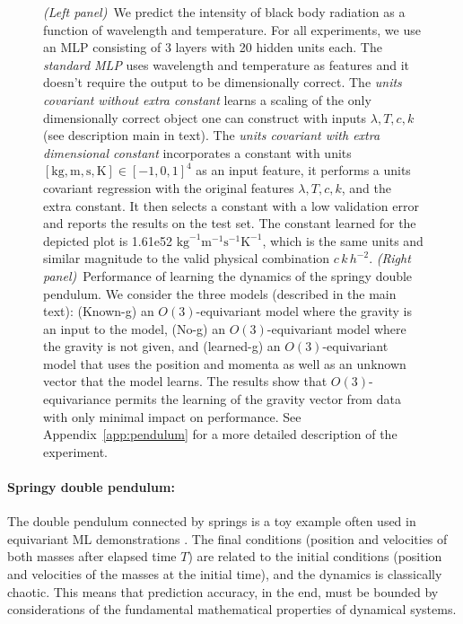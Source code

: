 \documentclass{article} %
\newcommand{\appref}[1]{Appendix~\ref{#1}}
\newcommand{\unit}[1]{\mathrm{#1}}
\newcommand{\kg}{\unit{kg}}
\newcommand{\m}{\unit{m}}
\newcommand{\s}{\unit{s}}
\newcommand{\K}{\unit{K}}
\begin{document}
\begin{figure}[t!]
    \caption{\textsl{(Left panel)}~We predict the intensity of black body radiation as a function of wavelength and temperature. For all experiments, we use an MLP consisting of 3 layers with 20 hidden units each. The \emph{standard MLP} uses wavelength and temperature as features and it doesn't require the output to be dimensionally correct. The \emph{units covariant without extra constant} learns a scaling of the only dimensionally correct object one can construct with inputs $\lambda, T, c, k$ (see description main in text). The \emph{units covariant with extra dimensional constant} incorporates a constant with units $[\kg, \m, \s, \K]\in[-1,0,1]^4$ as an input feature, it performs a units covariant regression with the original features $\lambda, T, c, k$, and the extra constant. It then selects a constant with a low validation error and reports the results on the test set. The constant learned for the depicted plot is 1.61e52 $\kg^{-1}\m^{-1}\s^{-1}\K^{-1}$, which is the same units and similar magnitude to the valid physical combination $c\,k\,h^{-2}$.
    \textsl{(Right panel)}~Performance of learning the dynamics of the springy double pendulum. We consider the three models (described in the main text): (Known-g) an $O(3)$-equivariant model where the gravity is an input to the model, (No-g) an $O(3)$-equivariant model where the gravity is not given, and (learned-g) an $O(3)$-equivariant model that uses the position and momenta as well as an unknown vector that the model learns. The results show that $O(3)$-equivariance permits the learning of the gravity vector from data with only minimal impact on performance. See \appref{app:pendulum} for a more detailed description of the experiment.}
    \label{fig:exps}
\end{figure}

\paragraph{Springy double pendulum:}
The double pendulum connected by springs is a toy example often used in equivariant ML demonstrations \citep{finzi2021practical,yao2021simple, villar2022dimensionless}. 
The final conditions (position and velocities of both masses after elapsed time $T$) are related to the initial conditions (position and velocities of the masses at the initial time), and the dynamics is classically chaotic.
This means that prediction accuracy, in the end, must be bounded by considerations of the fundamental mathematical properties of dynamical systems.
\end{document}
